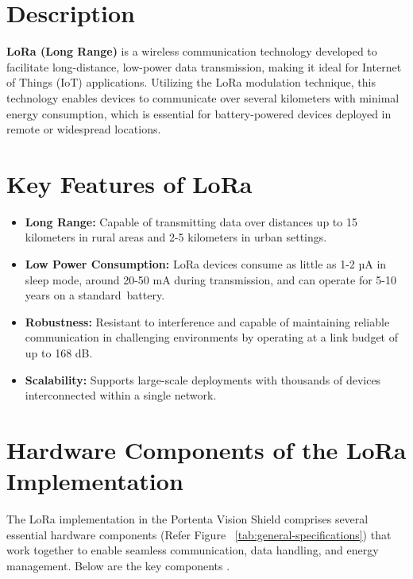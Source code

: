 \section{Description}

\textbf{LoRa (Long Range)} is a wireless communication technology developed to facilitate long-distance, low-power data transmission, making it ideal for Internet of Things (IoT) applications. Utilizing the LoRa modulation technique, this technology enables devices to communicate over several kilometers with minimal energy consumption, which is essential for battery-powered devices deployed in remote or widespread locations. \cite{semtech_lora:2025}

\section{Key Features of LoRa}

\begin{itemize}
	\item \textbf{Long Range:} Capable of transmitting data over distances up to 15 kilometers in rural areas and 2-5 kilometers in urban settings. 
	\item \textbf{Low Power Consumption:} LoRa devices consume as little as 1-2 µA in sleep mode, around 20-50 mA during transmission, and can operate for 5-10 years on a standard battery. \cite{st_connectivity:2025}
	\item \textbf{Robustness:} Resistant to interference and capable of maintaining reliable communication in challenging environments by operating at a link budget of up to 168 dB. \cite{thethingsnetwork_lorawan:2025}
	\item \textbf{Scalability:} Supports large-scale deployments with thousands of devices interconnected within a single network. \cite{jooby_lora_features:2025}
\end{itemize}

\section{Hardware Components of the LoRa Implementation}

The LoRa implementation in the Portenta Vision Shield comprises several essential hardware components (Refer Figure ~\ref{tab:general-specifications}) that work together to enable seamless communication, data handling, and energy management. Below are the key components \cite{arduino_portenta:2025}.

